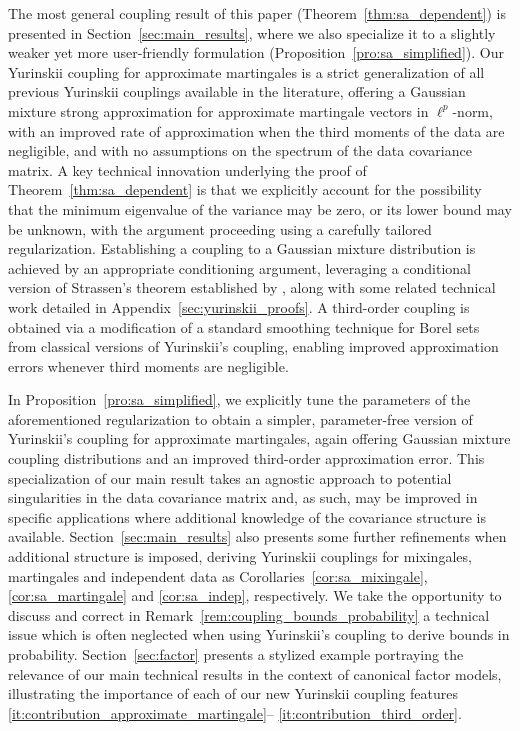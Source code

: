 The most general coupling result of this paper (Theorem~\ref{thm:sa_dependent})
is presented in Section~\ref{sec:main_results}, where we also specialize it to
a slightly weaker yet more user-friendly formulation
(Proposition~\ref{pro:sa_simplified}). Our Yurinskii coupling for approximate
martingales is a strict generalization of all previous Yurinskii couplings
available in the literature, offering a Gaussian mixture strong approximation
for approximate martingale vectors in $\ell^p$-norm, with an improved rate of
approximation when the third moments of the data are negligible, and with no
assumptions on the spectrum of the data covariance matrix. A key technical
innovation underlying the proof of Theorem~\ref{thm:sa_dependent} is that we
explicitly account for the possibility that the minimum eigenvalue of the
variance may be zero, or its lower bound may be unknown, with the argument
proceeding using a carefully tailored regularization. Establishing a coupling
to a Gaussian mixture distribution is achieved by an appropriate conditioning
argument, leveraging a conditional version of Strassen's theorem established by
\citet{chen2020jackknife}, along with some related technical work detailed in
Appendix~\ref{sec:yurinskii_proofs}.
A third-order coupling is obtained via a
modification of a standard smoothing technique for Borel sets from classical
versions of Yurinskii's coupling, enabling improved approximation errors
whenever third moments are negligible.

In Proposition~\ref{pro:sa_simplified}, we explicitly tune the parameters of
the aforementioned regularization to obtain a simpler, parameter-free version
of Yurinskii's coupling for approximate martingales, again offering Gaussian
mixture coupling distributions and an improved third-order approximation error.
This specialization of our main result takes an agnostic approach to potential
singularities in the data covariance matrix and, as such, may be improved in
specific applications where additional knowledge of the covariance structure is
available. Section~\ref{sec:main_results} also presents some further
refinements when additional structure is imposed, deriving Yurinskii couplings
for mixingales, martingales and independent data as
Corollaries~\ref{cor:sa_mixingale}, \ref{cor:sa_martingale} and
\ref{cor:sa_indep}, respectively. We take the opportunity to discuss and correct
in Remark~\ref{rem:coupling_bounds_probability} a technical issue which is
often neglected \citep{pollard2002user, li2020uniform} when using Yurinskii's
coupling to derive bounds in probability. Section~\ref{sec:factor} presents a
stylized example portraying the relevance of our main technical results in the
context of canonical factor models, illustrating the importance of each of our
new Yurinskii coupling features \ref{it:contribution_approximate_martingale}--%
\ref{it:contribution_third_order}.

